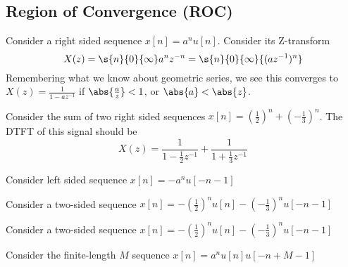 \documentclass{report}
\begin{document}
\subsection{Region of Convergence (ROC)}

\begin{example}
    Consider a right sided sequence $x[n] = a^n u[n]$. Consider its Z-transform
    \begin{equation*}
        X(z) = \s{n}{0}{\infty}a^n z^{-n} = \s{n}{0}{\infty}{(a z^{-1})^n}
    \end{equation*}
    Remembering what we know about geometric series, we see this converges to $X(z) = \frac{1}{1 - a z^{-1}}$ if $\abs{\frac{a}{z}} < 1$, or $\abs{a} < \abs{z}$.
\end{example}

\begin{example}
    Consider the sum of two right sided sequences $x[n] = (\frac{1}{2})^n + (-\frac{1}{3})^n$. The DTFT of this signal should be
    \begin{equation*}
        X(z) = \frac{1}{1 - \frac{1}{2} z ^{-1}} + \frac{1}{1 + \frac{1}{3} z ^{-1}}
    \end{equation*}
\end{example}

\begin{example}
    Consider left sided sequence $x[n] = -a^n u[-n - 1]$
\end{example}

\begin{example}
    Consider a two-sided sequence $x[n] = -(\frac{1}{2})^n u[n] - (- \frac{1}{3})^n u[-n - 1]$
\end{example}

\begin{example}
    Consider a two-sided sequence $x[n] = -(\frac{1}{2})^n u[n] - (- \frac{1}{3})^n u[-n - 1]$
\end{example}


\begin{example}
    Consider the finite-length $M$ sequence $x[n] = a^n u[n] u[-n + M - 1]$
\end{example}
\end{document}
